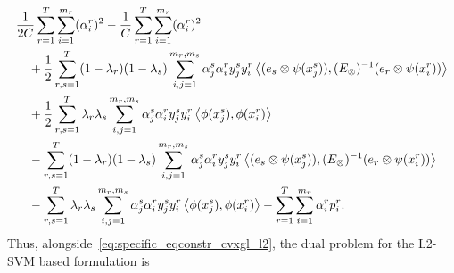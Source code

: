 \begin{equation}
    \nonumber
    \begin{aligned}
         & \frac{1}{2C} \sum_{r=1}^T \sum_{i=1}^{m_r} (\alpha_i^r)^2 - \frac{1}{C} \sum_{r=1}^T \sum_{i=1}^{m_r} (\alpha_i^r)^2                                                                             \\
         & \quad+ \frac{1}{2} \sum_{r, s=1}^T (1-\lambda_r)(1-\lambda_s) \sum_{i, j=1}^{m_r, m_s} \alpha_j^s \alpha_i^r y_j^s y_i^r \bm{\left\langle} (e_s \otimes \psi(x_j^s)), (E_\otimes)^{-1} (e_r \otimes \psi(x_i^r)) \bm{\right\rangle}  \\
         & \quad +\frac{1}{2} \sum_{r,s=1}^T \lambda_r \lambda_s \sum_{i, j=1}^{m_r, m_s} \alpha_j^s \alpha_i^r y_j^s y_i^r \bm{\left\langle} \phi(x_j^s), \phi(x_i^r) \bm{\right\rangle}                                                       \\
         & \quad - \sum_{r, s=1}^T (1-\lambda_r)(1-\lambda_s) \sum_{i, j=1}^{m_r, m_s} \alpha_j^s \alpha_i^r y_j^s y_i^r \bm{\left\langle} (e_s \otimes \psi(x_j^s)), (E_\otimes)^{-1} (e_r \otimes \psi(x_i^r)) \bm{\right\rangle}             \\
         & \quad - \sum_{r,s=1}^T \lambda_r \lambda_s \sum_{i, j=1}^{m_r, m_s} \alpha_j^s \alpha_i^r y_j^s y_i^r \bm{\left\langle} \phi(x_j^s), \phi(x_i^r) \bm{\right\rangle} - \sum_{r=1}^T \sum_{i=1}^{m_r} \alpha_i^r p_i^r . \\
    \end{aligned}
\end{equation}
Thus, alongside~\eqref{eq:specific_eqconstr_cvxgl_l2}, the dual problem for the L2-SVM based formulation is

